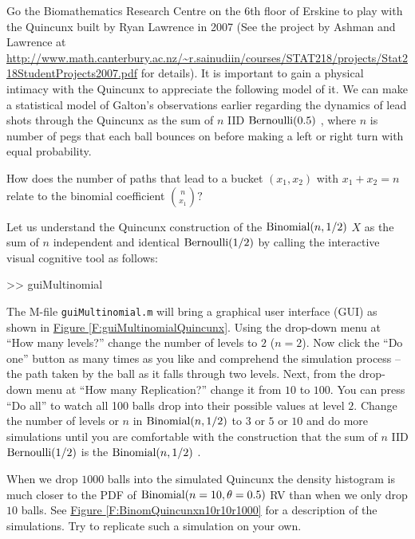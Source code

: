 Go the Biomathematics Research Centre on the 6th floor of Erskine to play with the Quincunx built by Ryan Lawrence in 2007 (See the project by Ashman and Lawrence at  \href{http://www.math.canterbury.ac.nz/~r.sainudiin/courses/STAT218/projects/Stat218StudentProjects2007.pdf}{\url{http://www.math.canterbury.ac.nz/~r.sainudiin/courses/STAT218/projects/Stat218StudentProjects2007.pdf}} %
for details).  It is important to gain a physical intimacy with the Quincunx to appreciate the following model of it.  We can make a statistical model of Galton's observations earlier regarding the dynamics of lead shots through the Quincunx as the sum of $n$ IID $\mbox{{\rm Bernoulli}}(0.5)$ , where $n$ is number of pegs that each ball bounces on before making a left or right turn with equal probability.  

\begin{exercise}
How does the number of paths that lead to a bucket $(x_1,x_2)$ with $x_1+x_2=n$ relate to the binomial coefficient $\binom{n}{x_1} ?$
\end{exercise}

\begin{labwork}\label{LW:QuincunxSampler}
Let us understand the Quincunx construction of the $\mbox{{\rm Binomial}}(n,1/2)$ \rv $X$ as the sum of $n$ independent and identical $\mbox{{\rm Bernoulli}}(1/2)$  by calling the interactive visual cognitive tool as follows:
\begin{VrbM}
>> guiMultinomial
\end{VrbM}
The M-file {\tt guiMultinomial.m} will bring a graphical user interface (GUI) as shown in \hyperref[F:guiMultinomialQuincunx]{Figure \ref*{F:guiMultinomialQuincunx}}.  Using the drop-down menu at ``How many levels?'' change the number of levels to $2$ ($n=2$).  Now click the ``Do one'' button as many times as you like and comprehend the simulation process -- the path taken by the ball as it falls through two levels.  Next, from the drop-down menu at ``How many  Replication?'' change it from $10$ to $100$.  You can press ``Do all'' to watch all 100 balls drop into their possible values at level $2$.  Change the number of levels or $n$ in $\mbox{{\rm Binomial}}(n,1/2)$ \rv to $3$ or $5$ or $10$ and do more simulations until you are comfortable with the construction that the sum of $n$ IID $\mbox{{\rm Bernoulli}}(1/2)$  is the $\mbox{{\rm Binomial}}(n,1/2)$ \rv.

When we drop $1000$ balls into the simulated Quincunx the density histogram is much closer to the PDF of $\mbox{{\rm Binomial}}(n=10,\theta=0.5)$ RV than when we only drop $10$ balls.  See \hyperref[F:BinomQuincunxn10r10r1000]{Figure \ref*{F:BinomQuincunxn10r10r1000}} for a description of the simulations.  Try to replicate such a simulation on your own.
\end{labwork}

